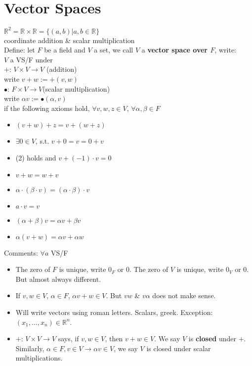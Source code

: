 \documentclass[11pt]{article}
\begin{document}
\section{Vector Spaces}
$\mathbb{R}^2=\mathbb{R}\times \mathbb{R}=\{(a,b)|a,b\in \mathbb{R}\}$\\
coordinate addition \& scalar multiplication\\
Define: let $F$ be a field and $V$ a set, we call $V$ a \textbf{vector space over $F$}, write: \\
$V$ a VS/F under \\
$+$: $V\times V\rightarrow V$ (addition)\\
write $v+w:=+(v,w)$\\
$\bullet$: $F\times V\rightarrow V$(scalar multiplication)\\
write $\alpha v:=\bullet(\alpha, v)$\\
if the following axioms hold, $\forall v, w, z\in V$, $\forall \alpha, \beta\in F$\\
\begin{itemize}
	\item $(v+w)+z=v+(w+z)$
	\item $\exists 0\in V$, s.t. $v+0=v=0+v$
	\item (2) holds and $v+(-1)\cdot v=0$
	\item $v+w=w+v$
	\item $\alpha\cdot(\beta\cdot v)=(\alpha\cdot\beta)\cdot v$
	\item $a\cdot v=v$
	\item $(\alpha+\beta)v=\alpha v+\beta v$
	\item $\alpha(v+w)=\alpha v+\alpha w$
\end{itemize}
Comments: $\forall a$ VS/F\\
\begin{itemize}
	\item The zero of $F$ is unique, write $0_F$ or $0$. The zero of $V$ is unique, write $0_V$ or $0$. But almost always different.
	\item If $v,w\in V$, $\alpha\in F$, $\alpha v+w\in V$. But $vw$ \& $v\alpha$ does not make sense.
	\item Will write vectors using roman letters. Scalars, greek. Exception: $(x_1,\ldots, x_n)\in\mathbb{R}^n$.
	\item $+$: $V\times V\rightarrow V$ says, if $v, w\in V$, then $v+w\in V$. We say $V$ is \textbf{closed} under $+$. Similarly, $\alpha\in F, v\in V\rightarrow \alpha v\in V$, we say $V$ is closed under scalar multiplications.
\end{itemize}
\end{document}
